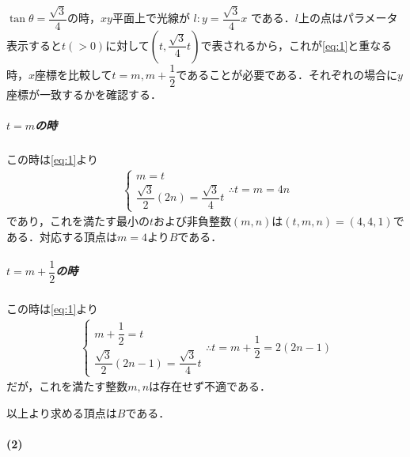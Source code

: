 \documentclass[../../main.tex]{subfiles}
\begin{document}
$\tan\theta=\dfrac{\sqrt{3}}{4}$の時，$xy$平面上で光線が $l : y = \dfrac{\sqrt{3}}{4}x$ である．$l$上の点はパラメータ表示すると$t(>0)$に対して$\left(t, \dfrac{\sqrt{3}}{4}t\right)$で表されるから，これが\cref{eq:1}と重なる時，$x$座標を比較して$t=m, m+\dfrac{1}{2}$であることが必要である．それぞれの場合に$y$座標が一致するかを確認する．

\subparagraph{$t=m$の時}

この時は\cref{eq:1}より
\begin{align}
  \begin{cases}
    m = t \\
    \dfrac{\sqrt{3}}{2}(2n) = \dfrac{\sqrt{3}}{4}t
  \end{cases}
  \therefore
  t = m = 4n
\end{align}
であり，これを満たす最小の$t$および非負整数$(m,n)$は$(t,m,n)=(4,4,1)$である．対応する頂点は$m=4$より$B$である．

\subparagraph{$t=m+\dfrac{1}{2}$の時}

この時は\cref{eq:1}より
\begin{align}
  \begin{cases}
    m+\dfrac{1}{2} = t \\
    \dfrac{\sqrt{3}}{2}(2n-1) = \dfrac{\sqrt{3}}{4}t
  \end{cases}
  \therefore
  t = m+\dfrac{1}{2} = 2(2n-1)
\end{align}
だが，これを満たす整数$m,n$は存在せず不適である．
\casesend

以上より求める頂点は$B$である．

\paragraph{(2)}
\end{document}
